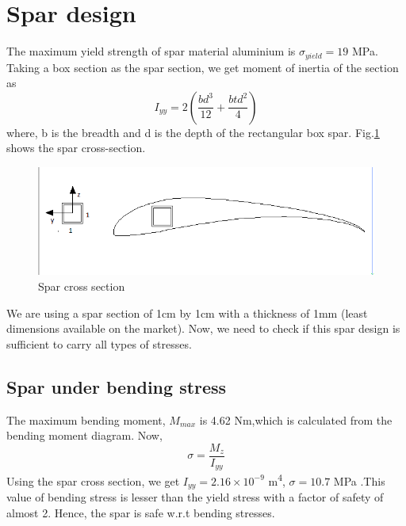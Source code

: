 \section{Spar design}
The maximum yield strength of spar material aluminium is $\sigma_{yield} = 19$ MPa. Taking a box section as the spar section, we get moment of inertia of the section as 
\begin{equation} I_{yy} = 2\left(\frac{bd^3}{12} + \frac{btd^2}{4}\right) \end{equation}
where, b is the breadth and d is the depth of the rectangular box spar. Fig.\ref{fig:spar} shows the spar cross-section.
\begin{figure}[H]
    \begin{center}
      \includegraphics[width=5.2in]{figures/spar.png}
\caption{Spar cross section}
       \label{fig:spar}
    \end{center}
\end{figure}
We are using a spar section of 1cm by 1cm with a thickness of 1mm (least dimensions available on the market). Now, we need to check if this spar design is sufficient to carry all types of stresses.

\subsection{Spar under bending stress}
The maximum bending moment, $M_{max}$ is 4.62 Nm,which is calculated from the bending moment diagram. Now,
\begin{equation} \sigma = \frac{M_z}{I_{yy}}  \end{equation}
Using the spar cross section, we get
$ I_{yy} = 2.16\times10^{-9} $ m\textsuperscript{4}, $\sigma = 10.7$ MPa
.This value of bending stress is lesser than the yield stress with a factor of safety of almost 2. Hence, the spar is safe w.r.t bending stresses.

